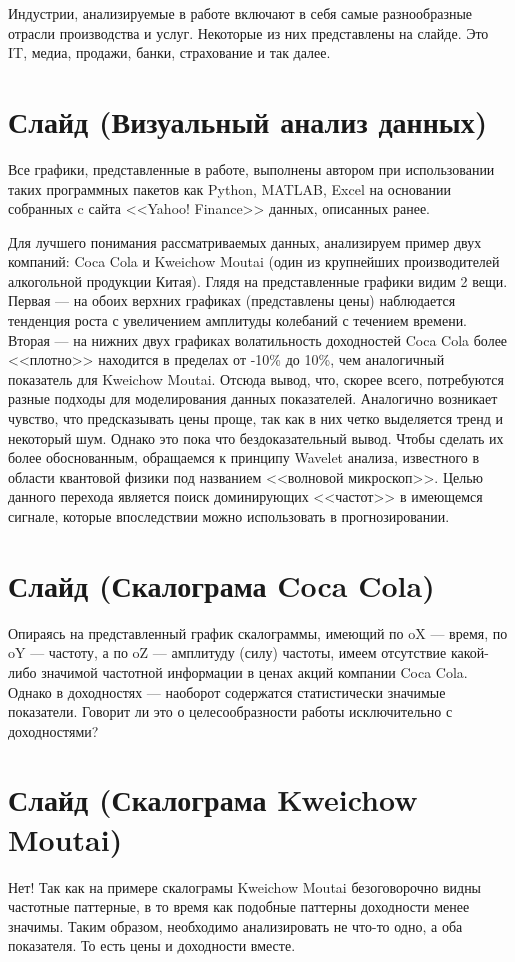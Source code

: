 \documentclass[a4paper, 12pt]{article}
\begin{document}
		Индустрии, анализируемые в работе включают в себя самые разнообразные отрасли производства и услуг. Некоторые из них представлены на слайде. Это IT, медиа, продажи, банки, страхование и так далее.
	\section{Слайд (Визуальный анализ данных)}
		Все графики, представленные в работе, выполнены автором при использовании таких программных пакетов как Python, MATLAB, Excel на основании собранных c сайта <<Yahoo! Finance>> данных, описанных ранее.
		
		Для лучшего понимания рассматриваемых данных, анализируем пример двух компаний: Coca Cola и Kweichow Moutai (один из крупнейших производителей алкогольной продукции Китая). Глядя на представленные графики видим 2 вещи. Первая --- на обоих верхних графиках (представлены цены) наблюдается тенденция роста с увеличением амплитуды колебаний с течением времени. Вторая --- на нижних двух графиках волатильность доходностей Coca Cola более <<плотно>> находится в пределах от -10\% до 10\%, чем аналогичный показатель для Kweichow Moutai. Отсюда вывод, что, скорее всего, потребуются разные подходы для моделирования данных показателей. Аналогично возникает чувство, что предсказывать цены проще, так как в них четко выделяется тренд и некоторый шум. Однако это пока что бездоказательный вывод. Чтобы сделать их более обоснованным, обращаемся к принципу Wavelet анализа, известного в области квантовой физики под названием <<волновой микроскоп>>. Целью данного перехода является поиск доминирующих <<частот>> в имеющемся сигнале, которые впоследствии можно использовать в прогнозировании.
	\section{Слайд (Скалограма Coca Cola)}
		Опираясь на представленный график скалограммы, имеющий по oX --- время, по oY --- частоту, а по oZ --- амплитуду (силу) частоты, имеем отсутствие какой-либо значимой частотной информации в ценах акций компании Coca Cola. Однако в доходностях --- наоборот содержатся статистически значимые показатели. Говорит ли это о целесообразности работы исключительно с доходностями?
	\section{Слайд (Скалограма Kweichow Moutai)}
		Нет! Так как на примере скалограмы Kweichow Moutai безоговорочно видны частотные паттерные, в то время как подобные паттерны доходности менее значимы. Таким образом, необходимо анализировать не что-то одно, а оба показателя. То есть цены и доходности вместе.
\end{document}
